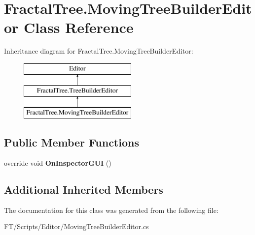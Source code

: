 \hypertarget{class_fractal_tree_1_1_moving_tree_builder_editor}{}\section{Fractal\+Tree.\+Moving\+Tree\+Builder\+Editor Class Reference}
\label{class_fractal_tree_1_1_moving_tree_builder_editor}
Inheritance diagram for Fractal\+Tree.\+Moving\+Tree\+Builder\+Editor\+:\begin{figure}[H]
\begin{center}
\leavevmode
\includegraphics[height=3.000000cm]{class_fractal_tree_1_1_moving_tree_builder_editor}
\end{center}
\end{figure}
\subsection*{Public Member Functions}
\begin{DoxyCompactItemize}
\item 
\mbox{\label{class_fractal_tree_1_1_moving_tree_builder_editor_ad14f3f2ae40f63659f883898b910f7aa}} 
override void {\bfseries On\+Inspector\+G\+UI} ()
\end{DoxyCompactItemize}
\subsection*{Additional Inherited Members}


The documentation for this class was generated from the following file\+:\begin{DoxyCompactItemize}
\item 
F\+T/\+Scripts/\+Editor/Moving\+Tree\+Builder\+Editor.\+cs\end{DoxyCompactItemize}

